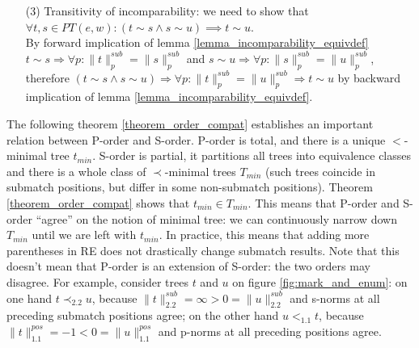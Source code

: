 \documentclass[AMA,STIX1COL]{WileyNJD-v2}
\newcommand{\PT}{PT}
\newcommand{\pnorm}[2]{\|{#1}\|^{pos}_{#2}}
\newcommand{\snorm}[2]{\|{#1}\|^{sub}_{#2}}
\begin{document}
\begin{proofEnd}
\begin{itemize}[itemsep=0.5em, topsep=0.5em]
        \item[(3)]
            Transitivity of incomparability: we need to show that $\forall t, s \in \PT(e,w): (t \sim s \wedge s \sim u) \implies t \sim u$.
            \\[0.5em]
            By forward implication of lemma \ref{lemma_incomparability_equivdef}
            $t \sim s \Rightarrow \forall p : \snorm{t}{p} = \snorm{s}{p}$ and
            $s \sim u \Rightarrow \forall p : \snorm{s}{p} = \snorm{u}{p}$, therefore
            $(t \sim s \wedge s \sim u) \Rightarrow \forall p : \snorm{t}{p} = \snorm{u}{p} \Rightarrow t \sim u$
            by backward implication of lemma \ref{lemma_incomparability_equivdef}.
    \end{itemize}
\end{proofEnd}

The following theorem \ref{theorem_order_compat} establishes an important relation between P-order and S-order.
P-order is total, and there is a unique $<$-minimal tree $t_{min}$.
S-order is partial, it partitions all trees into equivalence classes
and there is a whole class of $\prec$-minimal trees $T_{min}$
(such trees coincide in submatch positions, but differ in some non-submatch positions).
Theorem \ref{theorem_order_compat} shows that $t_{min} \in T_{min}$.
This means that P-order and S-order ``agree'' on the notion of minimal tree:
we can continuously narrow down $T_{min}$ until we are left with $t_{min}$.
In practice, this means that adding more parentheses in RE does not drastically change submatch results.
%
Note that this doesn't mean that P-order is an extension of S-order:
the two orders may disagree.
For example, consider trees $t$ and $u$ on figure \ref{fig:mark_and_enum}:
on one hand $t \prec_{2.2} u$, because $\snorm{t}{2.2} = \infty > 0 = \snorm{u}{2.2}$ and s-norms at all preceding submatch positions agree;
on the other hand $u <_{1.1} t$, because $\pnorm{t}{1.1} = -1 < 0 = \pnorm{u}{1.1}$
and p-norms at all preceding positions agree.
\end{document}
